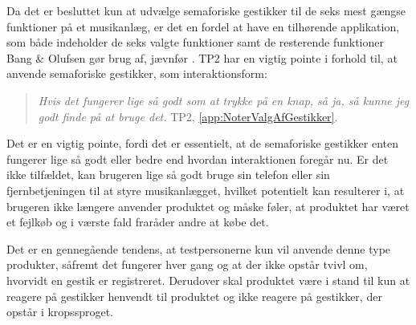 Da det er besluttet kun at udvælge semaforiske gestikker til de seks mest gængse funktioner på et musikanlæg, er det en fordel at have en tilhørende applikation, som både indeholder de seks valgte funktioner samt de resterende funktioner Bang $\&$ Olufsen gør brug af, jævnfør .\blankline
% 
TP2 har en vigtig pointe i forhold til, at anvende semaforiske gestikker, som interaktionsform: 
%
\begin{quotation}
\noindent
\textit{Hvis det fungerer lige så godt som at trykke på en knap, så ja, så kunne jeg godt finde på at bruge det.} TP2, \autoref{app:NoterValgAfGestikker}. 
\end{quotation}
%
Det er en vigtig pointe, fordi det er essentielt, at de semaforiske gestikker enten fungerer lige så godt eller bedre end hvordan interaktionen foregår nu. Er det ikke tilfældet, kan brugeren lige så godt bruge sin telefon eller sin fjernbetjeningen til at styre musikanlægget, hvilket potentielt kan resulterer i, at brugeren ikke længere anvender produktet og måske føler, at produktet har været et fejlkøb og i værste fald fraråder andre at købe det. 

Det er en gennegående tendens, at testpersonerne kun vil anvende denne type produkter, såfremt det fungerer hver gang og at der ikke opstår tvivl om, hvorvidt en gestik er registreret. Derudover skal produktet være i stand til kun at reagere på gestikker henvendt til produktet og ikke reagere på gestikker, der opstår i kropssproget.


